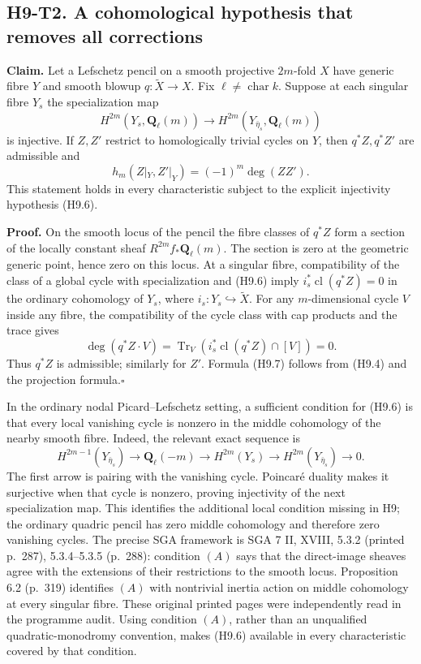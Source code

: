 \subsection*{H9-T2. A cohomological hypothesis that removes all corrections}

\textbf{Claim.} Let a Lefschetz pencil on a smooth projective $2m$-fold
$X$ have generic fibre $Y$ and smooth blowup $q:\widetilde X\to X$.
Fix $\ell\ne\operatorname{char}k$. Suppose at each singular fibre $Y_s$
the specialization map
\[
 H^{2m}(Y_s,\mathbf Q_\ell(m))\longrightarrow
 H^{2m}(Y_{\bar\eta_s},\mathbf Q_\ell(m))       \tag{H9.6}
\]
is injective. If $Z,Z'$ restrict to homologically trivial cycles on $Y$,
then $q^*Z,q^*Z'$ are admissible and
\[
 h_m(Z|_Y,Z'|_Y)=(-1)^m\deg(ZZ').               \tag{H9.7}
\]
This statement holds in every characteristic subject to the explicit
injectivity hypothesis (H9.6).

\textbf{Proof.} On the smooth locus of the pencil the fibre classes of
$q^*Z$ form a section of the locally constant sheaf
$R^{2m}f_*\mathbf Q_\ell(m)$. The section is zero at the geometric generic
point, hence zero on this locus. At a singular fibre, compatibility of the
class of a global cycle with specialization and (H9.6) imply
$i_s^*\operatorname{cl}(q^*Z)=0$ in the ordinary cohomology of $Y_s$,
where $i_s:Y_s\hookrightarrow\widetilde X$. For any $m$-dimensional cycle $V$
inside any fibre, the compatibility of the cycle class with cap products
and the trace gives
\[
 \deg(q^*Z\cdot V)=
 \operatorname{Tr}_{V}(i_s^*\operatorname{cl}(q^*Z)\cap[V])=0.
\]
Thus $q^*Z$ is admissible; similarly for $Z'$. Formula (H9.7) follows
from (H9.4) and the projection formula.\hfill$\square$

In the ordinary nodal Picard--Lefschetz setting, a sufficient condition
for (H9.6) is that every local vanishing cycle is nonzero in the middle
cohomology of the nearby smooth fibre. Indeed, the relevant exact sequence
is
\[
 H^{2m-1}(Y_{\bar\eta_s})\longrightarrow\mathbf Q_\ell(-m)
 \longrightarrow H^{2m}(Y_s)
 \longrightarrow H^{2m}(Y_{\bar\eta_s})\longrightarrow0.
\]
The first arrow is pairing with the vanishing cycle. Poincar\'e duality
makes it surjective when that cycle is nonzero, proving injectivity of the
next specialization map. This identifies the additional local condition
missing in H9; the ordinary quadric pencil has zero middle cohomology and
therefore zero vanishing cycles. The precise SGA framework is SGA 7 II,
XVIII, 5.3.2 (printed p.~287), 5.3.4--5.3.5 (p.~288): condition $(A)$ says
that the direct-image sheaves agree with the extensions of their
restrictions to the smooth locus. Proposition 6.2 (p.~319) identifies
$(A)$ with nontrivial inertia action on middle cohomology at every
singular fibre. These original printed pages were independently read in
the programme audit. Using condition $(A)$, rather than an unqualified
quadratic-monodromy convention, makes (H9.6) available in every
characteristic covered by that condition.

